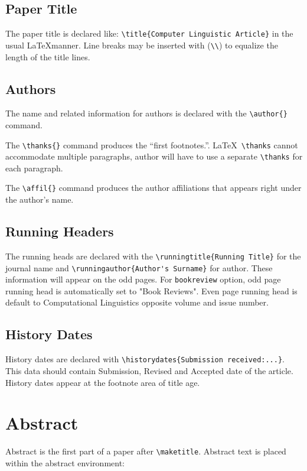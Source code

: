 \documentclass{clv3}
\begin{document}
\subsection{Paper Title}

The paper title is declared like: \verb|\title{Computer Linguistic Article}|
in the usual \LaTeX manner. Line breaks may be inserted with (\verb|\\|) to equalize 
the length of the title lines.

\subsection{Authors}
The name and related information for authors is declared with the \verb|\author{}| command. 

The \verb|\thanks{}| command produces the ``first footnotes.''. \LaTeX\ \verb|\thanks| 
cannot accommodate multiple paragraphs, author will have to use a separate \verb|\thanks|
for each paragraph.

The \verb|\affil{}| command produces the author affiliations that appears right under 
the author's name.

\subsection{Running Headers}
The running heads are declared with the \verb|\runningtitle{Running Title}| for the 
journal name and \verb|\runningauthor{Author's Surname}| for author. These information 
will appear on the odd pages. For {\tt bookreview} option, odd page running head is 
automatically set to "Book Reviews". Even page running head is default to Computational 
Linguistics opposite volume and issue number.

\subsection{History Dates}

History dates are declared with \verb|\historydates{Submission received:...}|. This data
should contain Submission, Revised and Accepted date of the article. History dates appear
at the footnote area of title age.


\section{Abstract}

Abstract is the first part of a paper after \verb|\maketitle|. Abstract text is 
placed within the abstract environment:
\end{document}
